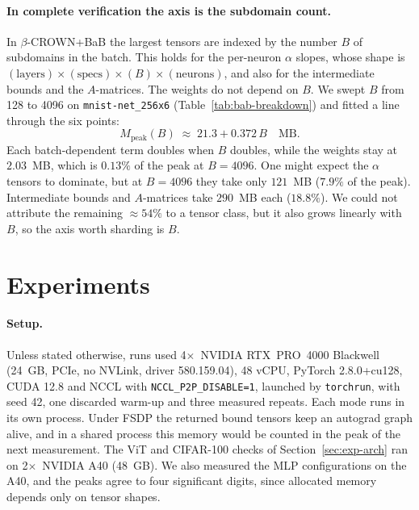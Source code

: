 \documentclass[runningheads]{llncs}
\begin{document}
\paragraph{In complete verification the axis is the subdomain count.}
In $\beta$-CROWN{+}BaB the largest tensors are indexed by the number $B$ of
subdomains in the batch. This holds for the per-neuron $\alpha$ slopes, whose
shape is $(\text{layers}) \times (\text{specs}) \times (B) \times
(\text{neurons})$, and also for the intermediate bounds and the $A$-matrices.
The weights do not depend on $B$. We swept $B$ from 128 to 4096 on
\texttt{mnist-net\_256x6} (Table~\ref{tab:bab-breakdown}) and fitted a line
through the six points:
\begin{equation}
  M_\text{peak}(B) \;\approx\; 21.3 + 0.372\,B \quad\text{MB}.
  \label{eq:bab-law}
\end{equation}
Each batch-dependent term doubles when $B$ doubles, while the weights stay at
$2.03$~MB, which is $0.13\%$ of the peak at $B{=}4096$. One might expect the
$\alpha$ tensors to dominate, but at $B{=}4096$ they take only $121$~MB ($7.9\%$
of the peak). Intermediate bounds and $A$-matrices take $290$~MB each
($18.8\%$). We could not attribute the remaining ${\approx}54\%$ to a tensor
class, but it also grows linearly with $B$, so the axis worth sharding is $B$.

\section{Experiments}
\label{sec:experiments}

\paragraph{Setup.}
Unless stated otherwise, runs used 4$\times$~NVIDIA RTX~PRO~4000 Blackwell
(24~GB, PCIe, no NVLink, driver 580.159.04), 48 vCPU, PyTorch 2.8.0+cu128,
CUDA 12.8 and NCCL with
\texttt{NCCL\_P2P\_DISABLE=1}, launched by \texttt{torchrun}, with seed 42, one
discarded warm-up and three measured repeats. Each mode runs in its own process.
Under FSDP the returned bound tensors keep an autograd graph alive, and in a
shared process this memory would be counted in the peak of the next
measurement. The ViT and
CIFAR-100 checks of Section~\ref{sec:exp-arch} ran on 2$\times$~NVIDIA A40
(48~GB). We also measured the MLP configurations on the A40, and the peaks agree
to four significant digits, since allocated memory depends only on tensor
shapes.
\end{document}
